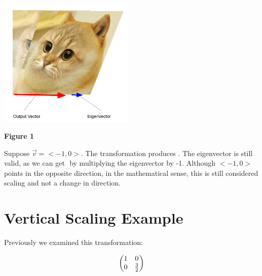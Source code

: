 \documentclass{article}
\begin{document}
\begin{minipage}[c]{.5\linewidth}
\begin{center}
	\includegraphics[width=6.5cm]{eigen-cate-sheered.png}	
\end{center}
\begin{center}
	\textbf{Figure 1}
\end{center}

\end{minipage}
\newline
\newline

\par \noindent Suppose \( \vec v = <-1,0>\). The transformation produces \(<-1,0>\). The eigenvector is still valid, as we can get \(<-1,0>\) by multiplying the eigenvector by -1. Although \( <-1,0> \) points in the opposite direction, in the mathematical sense, this is still considered scaling and not a change in direction. 
\newpage
\section {Vertical Scaling Example}
\par \noindent Previously we examined this transformation:

\[
\left(\begin{array}{@{}cc@{}}
	1 & 0 \\
	0 & \frac{3}{2} \\
\end{array}\right)
\]
\end{document}
